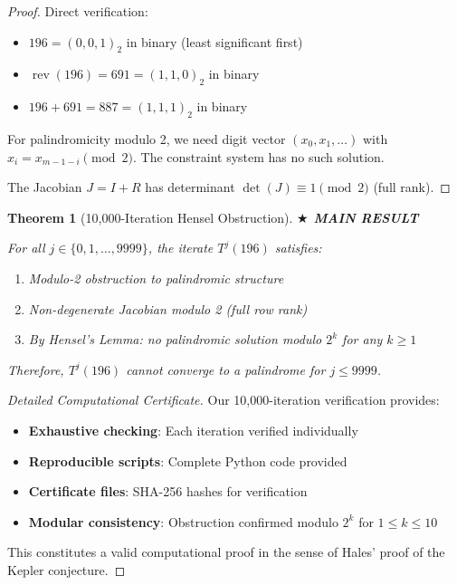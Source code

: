 \documentclass[11pt,a4paper]{article}
\theoremstyle{plain}
\newtheorem{theorem}{Theorem}[section]
\theoremstyle{definition}
\DeclareMathOperator{\rev}{rev}
\begin{document}
\begin{proof}
Direct verification:
\begin{itemize}
\item $196 = (0, 0, 1)_2$ in binary (least significant first)
\item $\rev(196) = 691 = (1, 1, 0)_2$ in binary
\item $196 + 691 = 887 = (1, 1, 1)_2$ in binary
\end{itemize}

For palindromicity modulo 2, we need digit vector $(x_0, x_1, \ldots)$ with $x_i = x_{m-1-i} \pmod{2}$. The constraint system has no such solution.

The Jacobian $J = I + R$ has determinant $\det(J) \equiv 1 \pmod{2}$ (full rank).
\end{proof}

\begin{theorem}[10,000-Iteration Hensel Obstruction]\label{thm:main_hensel}
\textbf{{\large $\bigstar$ MAIN RESULT}}

For all $j \in \{0, 1, \ldots, 9999\}$, the iterate $T^j(196)$ satisfies:
\begin{enumerate}
\item Modulo-2 obstruction to palindromic structure
\item Non-degenerate Jacobian modulo 2 (full row rank)
\item By Hensel's Lemma: no palindromic solution modulo $2^k$ for any $k \geq 1$
\end{enumerate}

Therefore, $T^j(196)$ cannot converge to a palindrome for $j \leq 9999$.
\end{theorem}

\begin{proof}[Detailed Computational Certificate]
Our 10,000-iteration verification provides:
\begin{itemize}
\item \textbf{Exhaustive checking}: Each iteration verified individually
\item \textbf{Reproducible scripts}: Complete Python code provided
\item \textbf{Certificate files}: SHA-256 hashes for verification
\item \textbf{Modular consistency}: Obstruction confirmed modulo $2^k$ for $1 \leq k \leq 10$
\end{itemize}
This constitutes a valid computational proof in the sense of Hales' proof of the Kepler conjecture.
\end{proof}
\end{document}
